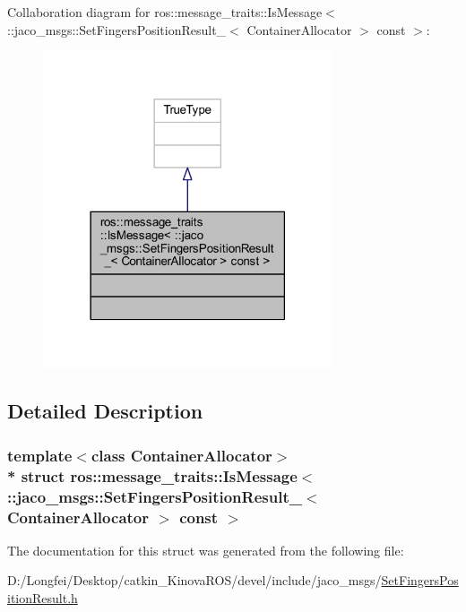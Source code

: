 Collaboration diagram for ros\+:\+:message\+\_\+traits\+:\+:Is\+Message$<$ \+:\+:jaco\+\_\+msgs\+:\+:Set\+Fingers\+Position\+Result\+\_\+$<$ Container\+Allocator $>$ const $>$\+:
\nopagebreak
\begin{figure}[H]
\begin{center}
\leavevmode
\includegraphics[width=242pt]{de/dcf/structros_1_1message__traits_1_1IsMessage_3_01_1_1jaco__msgs_1_1SetFingersPositionResult___3_01C772e4716ad4f44dab885da69e2f42222}
\end{center}
\end{figure}


\subsection{Detailed Description}
\subsubsection*{template$<$class Container\+Allocator$>$\\*
struct ros\+::message\+\_\+traits\+::\+Is\+Message$<$ \+::jaco\+\_\+msgs\+::\+Set\+Fingers\+Position\+Result\+\_\+$<$ Container\+Allocator $>$ const  $>$}



The documentation for this struct was generated from the following file\+:\begin{DoxyCompactItemize}
\item 
D\+:/\+Longfei/\+Desktop/catkin\+\_\+\+Kinova\+R\+O\+S/devel/include/jaco\+\_\+msgs/\hyperlink{SetFingersPositionResult_8h}{Set\+Fingers\+Position\+Result.\+h}\end{DoxyCompactItemize}
